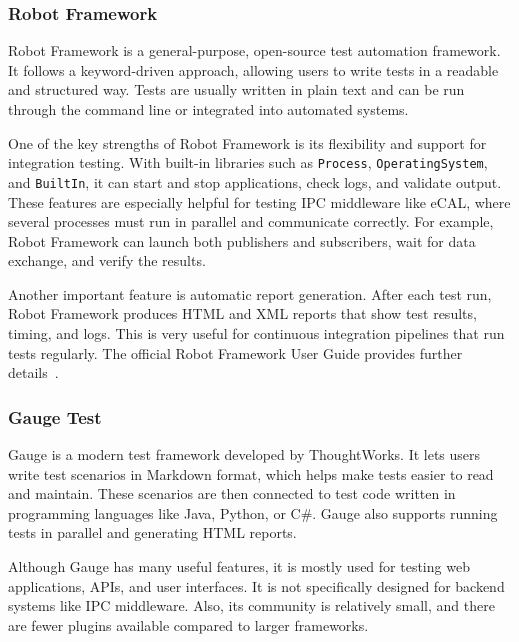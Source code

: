 \subsubsection*{Robot Framework}

Robot Framework is a general-purpose, open-source test automation framework. It follows a keyword-driven approach, allowing users to write tests in a readable and structured way. Tests are usually written in plain text and can be run through the command line or integrated into automated systems.

\vspace{1em}
One of the key strengths of Robot Framework is its flexibility and support for integration testing. With built-in libraries such as \texttt{Process}, \texttt{OperatingSystem}, and \texttt{BuiltIn}, it can start and stop applications, check logs, and validate output. These features are especially helpful for testing IPC middleware like eCAL, where several processes must run in parallel and communicate correctly. For example, Robot Framework can launch both publishers and subscribers, wait for data exchange, and verify the results.

\vspace{1em}
Another important feature is automatic report generation. After each test run, Robot Framework produces HTML and XML reports that show test results, timing, and logs. This is very useful for continuous integration pipelines that run tests regularly. The official Robot Framework User Guide provides further details~\cite{RobotFrameworkDocs}.

\subsubsection*{Gauge Test}

Gauge is a modern test framework developed by ThoughtWorks. It lets users write test scenarios in Markdown format, which helps make tests easier to read and maintain. These scenarios are then connected to test code written in programming languages like Java, Python, or C\#. Gauge also supports running tests in parallel and generating HTML reports.

\vspace{1em}
Although Gauge has many useful features, it is mostly used for testing web applications, APIs, and user interfaces. It is not specifically designed for backend systems like IPC middleware. Also, its community is relatively small, and there are fewer plugins available compared to larger frameworks.

